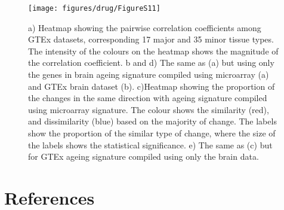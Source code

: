 \documentclass[12pt,twoside]{unicam}
\begin{document}
\begin{figure}

{\centering \texttt{[image: figures/drug/FigureS11]} 

}

\caption[Gene expression profiles of the ageing signature in different tissues.]{a) Heatmap showing the pairwise correlation coefficients among GTEx datasets, corresponding 17 major and 35 minor tissue types. The intensity of the colours on the heatmap shows the magnitude of the correlation coefficient. b and d) The same as (a) but using only the genes in brain ageing signature compiled using microarray (a) and GTEx brain dataset (b). c)Heatmap showing the proportion of the changes in the same direction with ageing signature compiled using microarray signature. The colour shows the similarity (red), and dissimilarity (blue) based on the majority of change. The labels show the proportion of the similar type of change, where the size of the labels shows the statistical significance. e) The same as (c) but for GTEx ageing signature compiled using only the brain data.}\label{fig:drugFigS11}
\end{figure}

\hypertarget{references}{%
\chapter*{References}\label{references}}

\noindent
\setlength{\parindent}{-0.20in}
\setlength{\leftskip}{0.20in}
\setlength{\parskip}{8pt}
\thispagestyle{empty}

\end{document}
